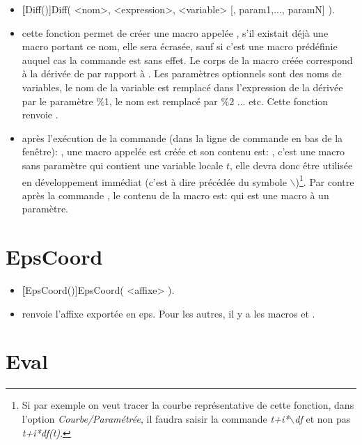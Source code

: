 \begin{itemize}
 \item \util \textbf[Diff()]{Diff( <nom>, <expression>, <variable> [, param1,..., paramN] )}.
 \item \desc cette fonction permet de créer une macro appelée , s'il existait déjà une macro portant ce nom, elle sera écrasée, sauf si c'est une macro prédéfinie auquel cas la commande est sans effet. Le corps de la macro créée correspond à la dérivée de  par rapport à . Les paramètres optionnels sont des noms de variables, le nom de la variable  est remplacé dans l'expression de la dérivée par le paramètre \%1, le nom  est remplacé par \%2 ... etc. Cette fonction renvoie \Nil.
 \item \exem après l'exécution de la commande (dans la ligne de commande en bas de la fenêtre): , une macro appelée  est créée et son contenu est: , c'est une macro sans paramètre qui contient une variable locale $t$, elle devra donc être utilisée en développement immédiat (c'est à dire précédée du symbole $\backslash$)\footnote{Si par exemple on veut tracer la courbe représentative de cette fonction, dans l'option \textit{Courbe/Paramétrée}, il faudra saisir la commande \textit{t+i*$\backslash$df} et non pas \textit{t+i*df(t)}.}. Par contre après la commande , le contenu de la macro  est:  qui est une macro à un paramètre.
\end{itemize}

\section{EpsCoord}\label{cmdEpsCoord}

\begin{itemize}
 \item \util \textbf[EpsCoord()]{EpsCoord( <affixe> )}.
 \item \desc renvoie l'affixe exportée en eps. Pour les autres, il y a les macros  et .
\end{itemize}

\section{Eval}\label{cmdEval}

